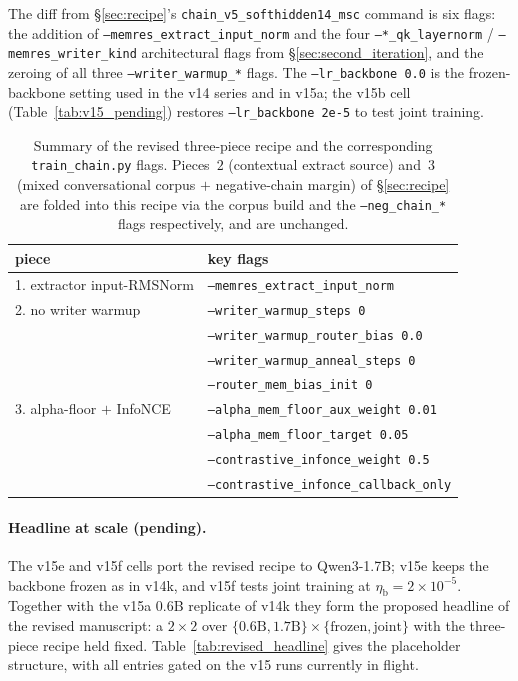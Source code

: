 \noindent The diff from \S\ref{sec:recipe}'s
\texttt{chain\_v5\_softhidden14\_msc} command is six flags: the
addition of \texttt{--memres\_extract\_input\_norm} and the four
\texttt{--*\_qk\_layernorm} / \texttt{--memres\_writer\_kind}
architectural flags from \S\ref{sec:second_iteration}, and the
zeroing of all three \texttt{--writer\_warmup\_*} flags. The
\texttt{--lr\_backbone 0.0} is the frozen-backbone setting used in
the v14 series and in v15a; the v15b cell (Table~\ref{tab:v15_pending})
restores \texttt{--lr\_backbone 2e-5} to test joint training.

\begin{table}[t]
\centering
\caption{Summary of the revised three-piece recipe and the
corresponding \texttt{train\_chain.py} flags. Pieces~$2$
(contextual extract source) and~$3$ (mixed conversational corpus
$+$ negative-chain margin) of \S\ref{sec:recipe} are folded into
this recipe via the corpus build and the
\texttt{--neg\_chain\_*} flags respectively, and are unchanged.}
\label{tab:revised_recipe}
\small
\begin{tabular}{ll}
\toprule
piece & key flags \\
\midrule
1. extractor input-RMSNorm   & \texttt{--memres\_extract\_input\_norm} \\
\midrule
2. no writer warmup          & \texttt{--writer\_warmup\_steps 0} \\
                             & \texttt{--writer\_warmup\_router\_bias 0.0} \\
                             & \texttt{--writer\_warmup\_anneal\_steps 0} \\
                             & \texttt{--router\_mem\_bias\_init 0} \\
\midrule
3. alpha-floor $+$ InfoNCE   & \texttt{--alpha\_mem\_floor\_aux\_weight 0.01} \\
                             & \texttt{--alpha\_mem\_floor\_target 0.05} \\
                             & \texttt{--contrastive\_infonce\_weight 0.5} \\
                             & \texttt{--contrastive\_infonce\_callback\_only} \\
\bottomrule
\end{tabular}
\end{table}

\paragraph{Headline at scale (pending).}
The v15e and v15f cells port the revised recipe to Qwen3-1.7B; v15e
keeps the backbone frozen as in v14k, and v15f tests joint training
at $\eta_{\text{b}}{=}2\!\times\!10^{-5}$. Together with the v15a
$0.6$B replicate of v14k they form the proposed headline of the
revised manuscript: a $2\!\times\!2$ over
$\{\text{0.6B}, \text{1.7B}\} \times \{\text{frozen}, \text{joint}\}$
with the three-piece recipe held fixed. Table~\ref{tab:revised_headline}
gives the placeholder structure, with all entries gated on the
v15 runs currently in flight.


